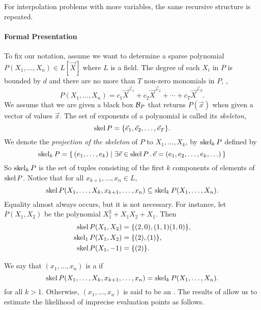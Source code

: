 For interpolation problems with more variables, the same recursive
structure is repeated. 

\paragraph{Formal Presentation}

To fix our notation, assume we want to determine a sparse polynomial
$P(X_1, \ldots, X_n) \in L[\vec X]$ where $L$ is a field.  The degree
of each $X_i$ in $P$ is bounded by $d$ and there are no more than $T$
non-zero monomials in $P$, \ie,
\[
P(X_1, \ldots, X_n) = c_1 \vec{X}^{\vec{e}_1} + c_2 \vec{X}^{\vec{e}_2} +
\cdots + c_T \vec{X}^{\vec{e}_T}.
\]
We assume that we are given a black box ${\cal B}_P$ that returns 
$P(\vec{x})$ when given a vector of values $\vec{x}$.  The set of 
exponents of a polynomial is called its {\em skeleton}, \ie{}   
\[
\mathop{\rm skel}\nolimits P = \{\vec{e}_1, \vec{e}_2, \ldots, \vec{e}_T \}.
\]
We denote the {\em projection of the skeleton} of $P$ to $X_1, \ldots,
X_k$, by $\mathop{\rm skel}\nolimits_k P$ defined by 
\[
\mathop{\rm skel}\nolimits_k P = \{\, (e_1, \ldots, e_k) \mid \exists \vec{e}\in \mathop{\rm skel}\nolimits P \,.\,
   \vec{e} = (e_1, e_2, \ldots, e_k, \ldots)\,\}
\]
So $\mathop{\rm skel}\nolimits_k P$ is the set of tuples consisting of the first $k$ components
of elements of $\mathop{\rm skel}\nolimits P$.  Notice that for all  $x_{k+1}, \ldots,
x_n \in L$, 
\[
\mathop{\rm skel}\nolimits P(X_1, \ldots, X_k, x_{k+1}, \ldots, x_n) 
\subseteq \mathop{\rm skel}\nolimits_k P(X_1, \ldots, X_n).
\]
Equality almost always occurs, but it is not necessary.  For instance, let
$P(X_1, X_2)$ be the polynomial $X_1^2 + X_1 X_2 + X_1$.  Then 
\[
\begin{aligned}
\mathop{\rm skel}\nolimits P(X_1, X_2) &= \{(2, 0), (1, 1) (1, 0)\}, \\
\mathop{\rm skel}\nolimits_1 P(X_1, X_2) & = \{ (2), (1) \}, \\
\mathop{\rm skel}\nolimits P(X_1, -1) & = \{ (2) \}.
\end{aligned}
\]

We say that $(x_1, \ldots, x_n)$ is a 
if 
\[
\mathop{\rm skel}\nolimits P(X_1, \ldots, X_k, x_{k+1}, \ldots, x_n) 
= \mathop{\rm skel}\nolimits_k P(X_1, \ldots, X_n).
\]
for all $k > 1$.  Otherwise, $(x_1, \ldots, x_n)$ is said to be an
.  The results of 
 allow us to estimate the likelihood of 
imprecise evaluation points as follows.

